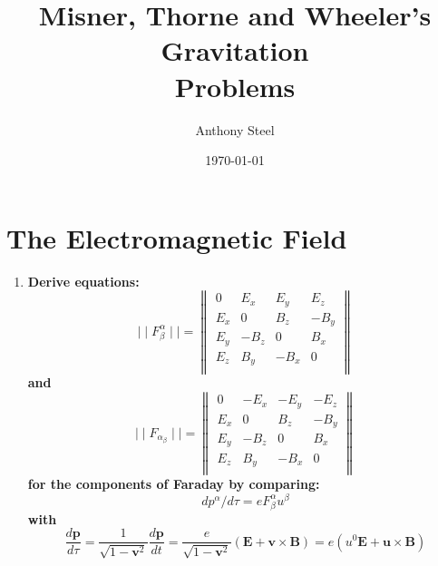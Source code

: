 \documentclass[9pt]{report}
\begin{document}
\title{Misner, Thorne and Wheeler's Gravitation\protect\\ Problems}
\author{Anthony Steel}
\date{\today}
\maketitle
\chapter{}
\chapter{}
\chapter{The Electromagnetic Field}
\begin{enumerate}
  \item \textbf{Derive equations:}
    \begin{equation}
       \mid  \mid F^\alpha_\beta  \mid \mid =
       \begin{Vmatrix}
         0 & E_x & E_y & E_z\\
         E_x & 0 & B_z & -B_y\\
         E_y & -B_z & 0 & B_x\\
         E_z & B_y & -B_x & 0\\
       \end{Vmatrix}
       \label{mixed-faraday}
     \end{equation}
    \textbf{and}
    \begin{equation}
       \mid  \mid F_\alpha_\beta  \mid \mid =
       \begin{Vmatrix}
         0 & -E_x & -E_y & -E_z\\
         E_x & 0 & B_z & -B_y\\
         E_y & -B_z & 0 & B_x\\
         E_z & B_y & -B_x & 0\\
       \end{Vmatrix}
     \end{equation}
    \textbf{for the components of Faraday by comparing:}
    \begin{equation}
      dp^\alpha / d\tau =  e F^\alpha_\beta u^\beta \label{momentum}
    \end{equation}
    \textbf{with}
    \begin{equation}
      \frac{d\textbf{p}}{d\tau} = \frac{1}{\sqrt{1-\textbf{v}^2}} \frac{d\textbf{p}}{dt} = \frac{e}{\sqrt{1-\textbf{v}^2} }(\textbf{E} + \textbf{v}\times\textbf{B}) = e(u^0\textbf{E} + \textbf{u} \times \textbf{B}) \label{momentum_spatial}

\end{equation}
\end{enumerate}
\end{document}
